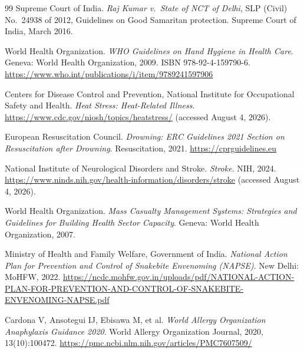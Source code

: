 \begin{thebibliography}{99}
Supreme Court of India.
\textit{Raj Kumar v.\ State of NCT of Delhi}, SLP (Civil) No.~24938 of 2012, Guidelines on Good Samaritan protection.
Supreme Court of India, March 2016.

World Health Organization.
\textit{WHO Guidelines on Hand Hygiene in Health Care}.
Geneva: World Health Organization, 2009. ISBN 978-92-4-159790-6. \url{https://www.who.int/publications/i/item/9789241597906}

Centers for Disease Control and Prevention, National Institute for Occupational Safety and Health.
\textit{Heat Stress: Heat-Related Illness}.
\url{https://www.cdc.gov/niosh/topics/heatstress/} (accessed August 4, 2026).

European Resuscitation Council.
\textit{Drowning: ERC Guidelines 2021 Section on Resuscitation after Drowning}.
Resuscitation, 2021. \url{https://cprguidelines.eu}

National Institute of Neurological Disorders and Stroke.
\textit{Stroke}.
NIH, 2024. \url{https://www.ninds.nih.gov/health-information/disorders/stroke} (accessed August 4, 2026).

World Health Organization.
\textit{Mass Casualty Management Systems: Strategies and Guidelines for Building Health Sector Capacity}.
Geneva: World Health Organization, 2007.

Ministry of Health and Family Welfare, Government of India.
\textit{National Action Plan for Prevention and Control of Snakebite Envenoming (NAPSE)}.
New Delhi: MoHFW, 2022. \url{https://ncdc.mohfw.gov.in/uploads/pdf/NATIONAL-ACTION-PLAN-FOR-PREVENTION-AND-CONTROL-OF-SNAKEBITE-ENVENOMING-NAPSE.pdf}

Cardona V, Ansotegui IJ, Ebisawa M, et al.
\textit{World Allergy Organization Anaphylaxis Guidance 2020}.
World Allergy Organization Journal, 2020, 13(10):100472. \url{https://pmc.ncbi.nlm.nih.gov/articles/PMC7607509/}

\end{thebibliography}
